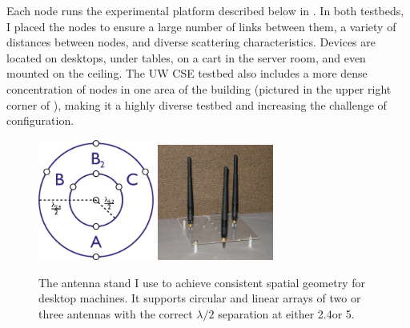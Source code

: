 Each node runs the experimental platform described below in . In both testbeds, I placed the nodes to ensure a large number of links between them, a variety of distances between nodes, and diverse scattering characteristics. Devices are located on desktops, under tables, on a cart in the server room, and even mounted on the ceiling. The UW CSE testbed also includes a more dense concentration of nodes in one area of the building (pictured in the upper right corner of ), making it a highly diverse testbed and increasing the challenge of configuration.

\begin{figure}[ht]
	\centering
	\includegraphics[width=1.5in]{figures/rpsma_dual_632_single_lines.pdf}%
	\hspace{1in}
	\includegraphics[height=1.5in,width=1.5in]{figures/antennas.jpg}
	\caption[A custom antenna stand used to achieve consistent spatial geometry]{\label{fig:antenna_stand}The antenna stand I use to achieve consistent spatial geometry for desktop machines. It supports circular and linear arrays of two or three antennas with the correct $\lambda/2$ separation at either 2.4\GHz or 5\GHz.}
\end{figure}
